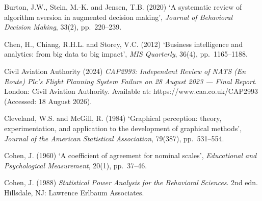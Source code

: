 \documentclass[11pt,a4paper]{article}
\numberwithin{figure}{section}
\numberwithin{table}{section}
\begin{document}
{\noindent\hypertarget{ref13}{}\begin{minipage}[t]{\dimexpr\linewidth-1.05cm\relax}Burton, J.W., Stein, M.-K. and Jensen, T.B. (2020) `A systematic review of algorithm aversion in augmented decision making', \emph{Journal of Behavioral Decision Making}, 33(2), pp.~220--239.\end{minipage}\par\vspace{4pt}
\noindent\hypertarget{ref14}{}\begin{minipage}[t]{\dimexpr\linewidth-1.05cm\relax}Chen, H., Chiang, R.H.L. and Storey, V.C. (2012) `Business intelligence and analytics: from big data to big impact', \emph{MIS Quarterly}, 36(4), pp.~1165--1188.\end{minipage}\par\vspace{4pt}
\noindent\hypertarget{ref15}{}\begin{minipage}[t]{\dimexpr\linewidth-1.05cm\relax}Civil Aviation Authority (2024) \emph{CAP2993: Independent Review of NATS (En Route) Plc's Flight Planning System Failure on 28 August 2023 --- Final Report}. London: Civil Aviation Authority. Available at: https://www.caa.co.uk/CAP2993 (Accessed: 18 August 2026).\end{minipage}\par\vspace{4pt}
\noindent\hypertarget{ref16}{}\begin{minipage}[t]{\dimexpr\linewidth-1.05cm\relax}Cleveland, W.S. and McGill, R. (1984) `Graphical perception: theory, experimentation, and application to the development of graphical methods', \emph{Journal of the American Statistical Association}, 79(387), pp.~531--554.\end{minipage}\par\vspace{4pt}
\noindent\hypertarget{ref17}{}\begin{minipage}[t]{\dimexpr\linewidth-1.05cm\relax}Cohen, J. (1960) `A coefficient of agreement for nominal scales', \emph{Educational and Psychological Measurement}, 20(1), pp.~37--46.\end{minipage}\par\vspace{4pt}
\noindent\hypertarget{ref18}{}\begin{minipage}[t]{\dimexpr\linewidth-1.05cm\relax}Cohen, J. (1988) \emph{Statistical Power Analysis for the Behavioral Sciences}. 2nd edn. Hillsdale, NJ: Lawrence Erlbaum Associates.\end{minipage}\par\vspace{4pt}
}
\end{document}
